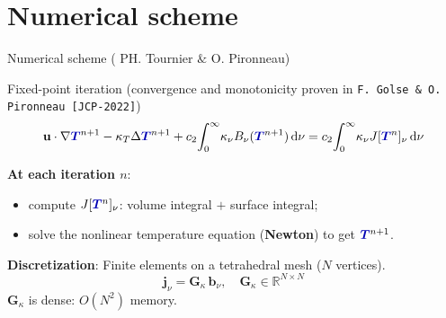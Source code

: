 \documentclass[8pt, xcolor=table,aspectratio=169]{beamer}
\begin{document}
\section{Numerical scheme}
\begin{frame}{\textcolor{activecolor}{Numerical scheme \small {( PH. Tournier $\&$ O. Pironneau) } }}
  \begin{block}{Fixed-point iteration (convergence and monotonicity proven in \texttt{F. Golse \& O. Pironneau [JCP-2022]})}
    \[
      \mathbf{u}\cdot\nabla \temperature^{n+1}-\kappa_T\Delta \temperature^{n+1}+c_2\!\int_0^\infty\!\kappa_\nu B_\nu(\temperature^{n+1})\dd\nu
      = c_2\!\int_0^\infty\!\kappa_\nu J[\temperature^{n}]_\nu\dd\nu
    \]
  \end{block}
      \textbf{At each iteration $n$}:
      \begin{itemize}[label=$\square$]\setlength\itemsep{0.6em}
        \item compute $J[\temperature^n]_\nu$: volume integral $+$ surface integral;
      \item solve the nonlinear temperature equation (\textbf{Newton}) to get $\temperature^{n+1}$.
      \end{itemize}
      \textbf{Discretization}: Finite elements on a tetrahedral mesh ($N$ vertices).
      \[ \mathbf{j}_\nu = \mathbf{G}_\kappa\,\mathbf{b}_\nu,\quad \mathbf{G}_\kappa\in\mathbb{R}^{N\times N} \]
      \alert{$\mathbf{G}_\kappa$ is dense: $O(N^2)$ memory.}
\end{frame}
\end{document}
